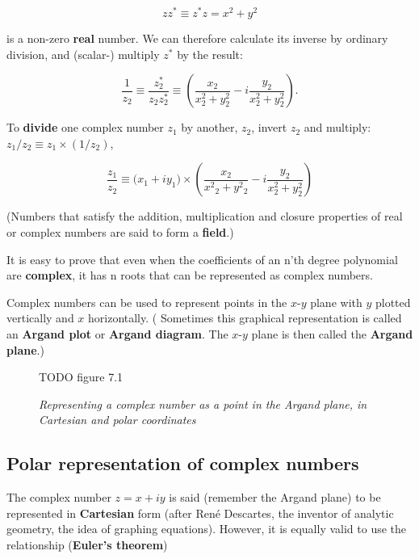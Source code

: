 \begin{equation*}
  zz^* \equiv z^*z = x^2 + y^2
\end{equation*}

is a non-zero \textbf{real} number. We can therefore calculate its inverse by ordinary division, and (scalar-) multiply $z^*$ by the result:

\begin{equation}
  \frac{1}{z_2} \equiv \frac{z_2^*}{z_2z_2^*} \equiv \left(\frac{x_2}{x_2^2 + y_2^2} - i \frac{y_2}{x_2^2 + y_2^2}\right).
\end{equation}

To \textbf{divide} one complex number $z_1$ by another, $z_2$, invert $z_2$ and multiply: $z_1/z_2 \equiv z_1 \times (1/z_2)$, \ie

\begin{equation}
  \frac{z_1}{z_2} \equiv \big(x_1 + iy_1\big) \times \left(\frac{x_2}{x{^2}{_2} + y{^2}{_2}} - i \frac{y_2}{x_2^2 + y_2^2}\right)
\end{equation}

(Numbers that satisfy the addition, multiplication and closure properties of real or complex numbers are said to form a \textbf{field}.)

It is easy to prove that even when the coefficients of an n'th degree polynomial are \textbf{complex}, it has n roots that can be represented as complex numbers.

Complex numbers can be used to represent points in the $x$-$y$ plane with $y$ plotted vertically and $x$ horizontally. ( Sometimes this graphical representation is called an \textbf{Argand plot} or \textbf{Argand diagram}. The $x$-$y$ plane is then called the \textbf{Argand plane}.)

\begin{figure}
    \center
    TODO figure 7.1
    \caption{\textit{Representing a complex number as a point in the Argand plane, in Cartesian and polar coordinates}}
    \label{fig:07_01}
\end{figure}

\subsection{Polar representation of complex numbers}

The complex number $z = x + iy$ is said (remember the Argand plane) to be represented in \textbf{Cartesian} form (after Ren\'e Descartes, the inventor of analytic geometry, \ie the idea of graphing equations). However, it is equally valid to use the relationship (\textbf{Euler’s theorem})

